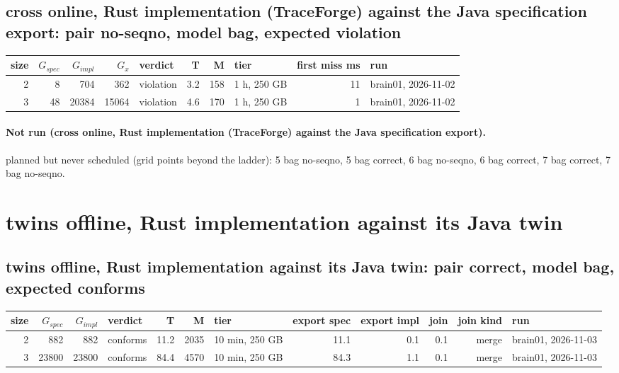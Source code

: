 \documentclass[10pt]{article}
\begin{document}
\subsection*{cross online, Rust implementation (TraceForge) against the Java specification export: pair \textsf{no-seqno}, model bag, expected violation}
\begin{longtable}{@{}rrrrlrrlrl@{}}
\toprule
size & $G_{\mathit{spec}}$ & $G_{\mathit{impl}}$ & $G_x$ & verdict & T & M & tier & first miss ms & run \\
\midrule
\endhead
\color{red} 2 & 8 & 704 & 362 & violation & 3.2 & 158 & 1 h, 250 GB & 11 & brain01, 2026-11-02 \\
\color{red} 3 & 48 & 20384 & 15064 & violation & 4.6 & 170 & 1 h, 250 GB & 1 & brain01, 2026-11-02 \\
\bottomrule
\end{longtable}
\paragraph{Not run (cross online, Rust implementation (TraceForge) against the Java specification export).}
planned but never scheduled (grid points beyond the ladder): 5 bag no-seqno, 5 bag correct, 6 bag no-seqno, 6 bag correct, 7 bag correct, 7 bag no-seqno.\par
\section*{twins offline, Rust implementation against its Java twin}
\subsection*{twins offline, Rust implementation against its Java twin: pair \textsf{correct}, model bag, expected conforms}
\begin{longtable}{@{}rrrlrrlrrrrl@{}}
\toprule
size & $G_{\mathit{spec}}$ & $G_{\mathit{impl}}$ & verdict & T & M & tier & export spec & export impl & join & join kind & run \\
\midrule
\endhead
\color{blue} 2 & 882 & 882 & conforms & 11.2 & 2035 & 10 min, 250 GB & 11.1 & 0.1 & 0.1 & merge & brain01, 2026-11-03 \\
\color{blue} 3 & 23800 & 23800 & conforms & 84.4 & 4570 & 10 min, 250 GB & 84.3 & 1.1 & 0.1 & merge & brain01, 2026-11-03 \\
\bottomrule
\end{longtable}
\end{document}
